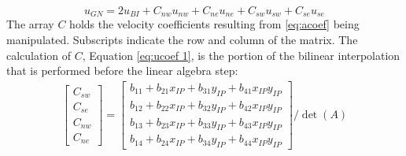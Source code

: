 \documentclass[preprint,12pt,5p]{elsarticle}
\begin{document}
\begin{equation}
u_{GN} = 2u_{BI} + C_{nw}u_{nw} + C_{ne}u_{ne} + C_{sw}u_{sw} + C_{se}u_{se}\label{eq:ID reorganized interpolation}
\end{equation}
The array $C$ holds the velocity coefficients resulting from \eqref{eq:acoef} being manipulated. 
Subscripts indicate the row and column of the matrix. 
The calculation of $C$, Equation \eqref{eq:ucoef 1}, is the portion of the bilinear interpolation that is performed before the linear algebra step:
\begin{gather}
\begin{bmatrix}
C_{sw}\\
C_{se}\\
C_{nw}\\
C_{ne}
\end{bmatrix}
=
\begin{bmatrix}
b_{11}+b_{21}x_{IP}+b_{31}y_{IP}+b_{41}x_{IP}y_{IP}\\
b_{12}+b_{22}x_{IP}+b_{32}y_{IP}+b_{42}x_{IP}y_{IP}\\
b_{13}+b_{23}x_{IP}+b_{33}y_{IP}+b_{43}x_{IP}y_{IP}\\
b_{14}+b_{24}x_{IP}+b_{34}y_{IP}+b_{44}x_{IP}y_{IP}
\end{bmatrix}
/\det{(A)}
\label{eq:ucoef 1}
\end{gather}
\end{document}
